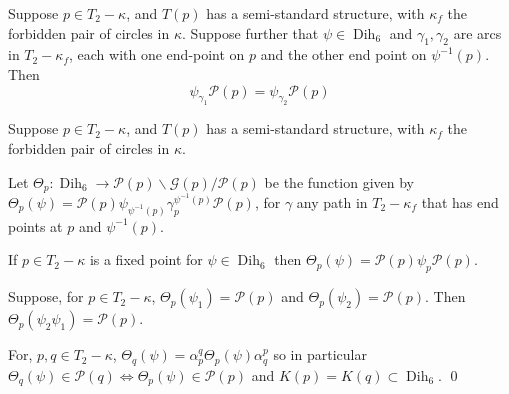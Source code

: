 \documentclass[10pt,a4paper]{amsart}
\newcommand{\Dih}{\operatorname{Dih}}
\newcommand{\bs}{\backslash}
\newcommand{\calG}{\mathcal G}
\newcommand{\calP}{\mathcal P}
\begin{document}
\begin{prop} \label{prop:G/P}  Suppose $p \in T_2 - \kappa$, and $T(p)$ has a semi-standard structure, with $\kappa_f$ the forbidden pair of circles in $\kappa$.  Suppose further that $\psi \in \Dih_6$ and $\gamma_1, \gamma_2$ are arcs in $T_2 - \kappa_f$, each with one end-point on $p$ and the other end point on $\psi^{-1}(p)$.  Then 
\[\psi_{\gamma_1} \calP(p) = \psi_{\gamma_2}\calP(p)\]
\end{prop}  

\begin{defin} \label{defin:thetap}  Suppose $p \in T_2 - \kappa$, and $T(p)$ has a semi-standard structure, with $\kappa_f$ the forbidden pair of circles in $\kappa$. 

Let $\Theta_p: \Dih_6 \to \calP(p) \bs\calG(p)/\calP(p)$ be the function given by $\Theta_p(\psi) = \calP(p) \psi_{\psi^{-1}(p)} {\gamma}_p^{\psi^{-1}(p)} \calP(p)$, for $\gamma$ any path in $T_2 - \kappa_f$ that has end points at $p$ and $\psi^{-1}(p)$.  
\end{defin}

\begin{lemma} \label{lemma:fixedp} If $p \in T_2 - \kappa$ is a fixed point for $\psi \in \Dih_6$ then $\Theta_p(\psi) = \calP(p) \psi_p  \calP(p)$.
\end{lemma}

\begin{lemma}   \label{lemma:thetaprod} Suppose, for $p \in T_2 - \kappa$, $\Theta_p (\psi_1) = \calP(p)$ and $\Theta_p (\psi_2) = \calP(p)$.  Then $\Theta_p (\psi_2 \psi_1) = \calP(p)$.
\end{lemma}

\begin{cor} \label{cor:PpPq} For, $p, q \in T_2 - \kappa$, $\Theta_q(\psi) = \alpha_p^q \Theta_p(\psi) \alpha_q^p$ so in particular 
$\Theta_q(\psi) \in \calP(q) \iff \Theta_p(\psi) \in \calP(p)$ and $K(p) = K(q) \subset \Dih_6$.  \qed
\end{cor}
\end{document}
